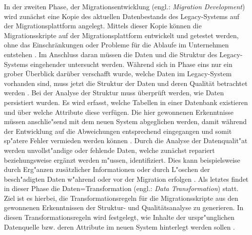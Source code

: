 In der zweiten Phase, der Migrationsentwicklung (engl.: \textit{Migration Development}) wird zunächst eine Kopie des aktuellen Datenbestands des Legacy-Systems auf der Migrationsplattform angelegt. Mittels dieser Kopie können die Migrationsskripte auf der Migrationsplattform entwickelt und getestet werden, ohne das Einschränkungen oder Probleme für die Ablaufe im Unternehmen entstehen \citep[S.~7]{klausMatthesSchulz-2012}. Im Anschluss daran müssen die Daten und die Struktur des Legacy-Systems eingehender untersucht werden. Während sich in Phase eins nur ein grober Überblick darüber verschafft wurde, welche Daten im Legacy-System vorhanden sind, muss jetzt die Struktur der Daten und deren Qualität betrachtet werden \citep[S.~7f.]{klausMatthesSchulz-2012}. Bei der Analyse der Struktur muss überprüft werden, wie Daten persistiert wurden. Es wird erfasst, welche Tabellen in einer Datenbank existieren und über welche Attribute diese verfügen. Die hier gewonnenen Erkenntnisse müssen anschlie"send mit dem neuen System abgeglichen werden, damit während der Entwicklung auf die Abweichungen entsprechend eingegangen und somit sp"atere Fehler vermieden werden können \citep[S.~8]{klausMatthesSchulz-2012}. Durch die Analyse der Datenqualit"at werden unvollst"andige oder fehlende Daten, welche zunächst repariert beziehungsweise ergänzt werden m"ussen, identifiziert. Dies kann beispielsweise durch Erg"anzen zusätzlicher Informationen oder durch L"oschen der besch"adigten Daten w"ahrend oder vor der Migration erfolgen \citep[S.~7f.]{klausMatthesSchulz-2012}. Als letztes findet in dieser Phase die Daten=Transformation (engl.: \textit{Data Transformation}) statt. Ziel ist es hierbei, die Transformationsregeln für die Migrationsskripte aus den gewonnenen Erkenntnissen der Struktur- und Qualitätsanalyse zu generieren. In diesen Transformationsregeln wird festgelegt, wie Inhalte der urspr"unglichen Datenquelle bzw. deren Attribute im neuen System hinterlegt werden sollen \citep[S.~8]{klausMatthesSchulz-2012}.
\lb
